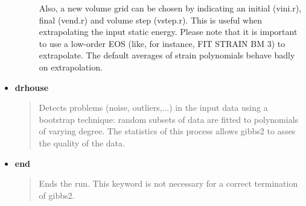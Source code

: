 \documentclass[a4paper]{article}
\begin{document}
\begin{itemize}
\begin{description}
Also, a new volume grid can be chosen by indicating an initial
(vini.r), final (vend.r) and volume step (vstep.r). This is useful
when extrapolating the input static energy. Please note that it is
important to use a low-order EOS (like, for instance, FIT STRAIN BM
3) to extrapolate. The default averages of strain polynomials
behave badly on extrapolation.

\end{description}

\item \textbf{drhouse}
%
\begin{quote}

Detects problems (noise, outliers,...) in the input data using a
bootstrap technique: random subsets of data are fitted to
polynomials of varying degree. The statistics of this process
allows gibbs2 to asses the quality of the data.

\end{quote}

\item \textbf{end}
%
\begin{quote}

Ends the run. This keyword is not necessary for a correct
termination of gibbs2.

\end{quote}

\end{itemize}
\end{document}
